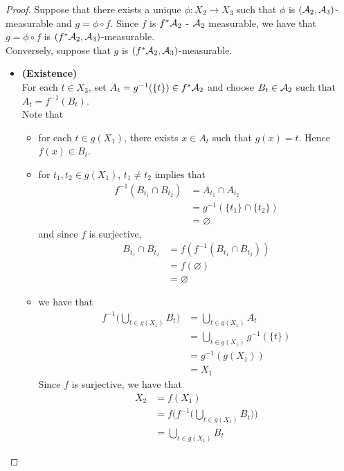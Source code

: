 \documentclass{book}
\begin{document}
	\begin{proof}
		Suppose that there exists a unique $\phi: X_2 \rightarrow X_3$ such that $\phi$ is $(\mathcal{A}_2, \mathcal{A}_3)$-measurable and $g = \phi \circ f$. Since $f$ is $f^* \mathcal{A}_2$ - $\mathcal{A}_2$ measurable, we have that $g = \phi \circ f$ is $(f^*\mathcal{A}_2, \mathcal{A}_3)$-measurable.  \\
		Conversely, suppose that $g$ is $(f^*\mathcal{A}_2, \mathcal{A}_3)$-measurable. \\
		\begin{itemize}
			\item \textbf{(Existence)} \\
			For each $t \in X_3$, set $A_t = g^{-1}(\{t\}) \in f^* \mathcal{A}_2$ and choose $B_t \in \mathcal{A}_2$ such that $A_t = f^{-1}(B_t)$. \\
			Note that 
			\begin{itemize}
				\item for each $t \in g(X_1)$, there exists $x \in A_t$ such that $g(x) = t$. Hence $f(x) \in B_t$.\\
				\item for $t_1, t_2 \in g(X_1)$, $t_1 \neq t_2$ implies that
				\begin{align*}
					f^{-1}(B_{t_1} \cap B_{t_2}) 
					&= A_{t_1} \cap A_{t_2} \\
					&= g^{-1}(\{t_1\} \cap \{t_2\}) \\
					&= \varnothing
				\end{align*}	 
				and since $f$ is surjective, 
				\begin{align*}
					B_{t_1} \cap  B_{t_2} 
					& = f(f^{-1}(B_{t_1} \cap  B_{t_2} )) \\
					&= f(\varnothing) \\
					&= \varnothing
				\end{align*}
				\item we have that 
				\begin{align*}
					f^{-1} \bigg( \bigcup_{t \in g(X_1)} B_t\bigg) 
					&=  \bigcup_{t \in g(X_1)} A_t \\
					&= \bigcup_{t \in g(X_1)} g^{-1}(\{t\}) \\
					&= g^{-1}(g(X_1)) \\
					&= X_1
				\end{align*}
				Since $f$ is surjective, we have that 
				\begin{align*}
					X_2
					&= f(X_1) \\
					&= f \bigg( f^{-1} \bigg( \bigcup_{t \in g(X_1)} B_t\bigg)  \bigg) \\
					&= \bigcup_{t \in g(X_1)} B_t

\end{align*}
\end{itemize}
\end{itemize}
\end{proof}
\end{document}
